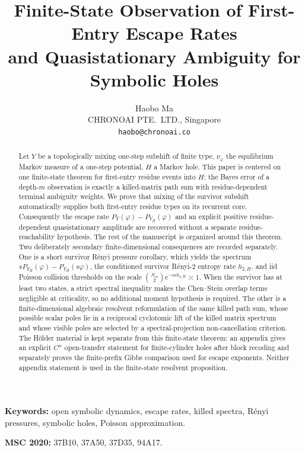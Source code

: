 \documentclass[10pt,a4paper]{article}
\title{Finite-State Observation of First-Entry Escape Rates\\
and Quasistationary Ambiguity for Symbolic Holes}
\author{Haobo Ma\\
\small CHRONOAI PTE.\ LTD., Singapore\\
\small\texttt{haobo@chronoai.co}}
\date{}
\theoremstyle{plain}
\theoremstyle{definition}
\theoremstyle{remark}
\begin{document}
\maketitle

\begin{abstract}
Let \(Y\) be a topologically mixing one-step subshift of finite type,
\(\nu_\varphi\) the equilibrium Markov measure of a one-step potential,
\(H\) a Markov hole.  This paper is centered on one finite-state
theorem for first-entry residue events into \(H\): the Bayes error of a
depth-\(m\) observation is exactly a killed-matrix path sum with
residue-dependent terminal ambiguity weights.  We prove that mixing of
the survivor subshift automatically supplies both first-entry residue
types on its recurrent core.  Consequently the escape rate
\(P_Y(\varphi)-P_{Y_H}(\varphi)\) and an explicit positive
residue-dependent quasistationary amplitude are recovered without a
separate residue-reachability hypothesis.  The rest of the manuscript
is organized around this theorem.  Two deliberately secondary
finite-dimensional consequences are recorded separately.  One is a
short survivor R\'enyi pressure corollary, which yields the spectrum
\(sP_{Y_H}(\varphi)-P_{Y_H}(s\varphi)\), the conditioned survivor
R\'enyi-\(2\) entropy rate \(h_{2,H}\), and iid Poisson collision
thresholds on the scale
\(\binom{N_m}{2}e^{-mh_{2,H}}\asymp 1\).  When the survivor has at
least two states, a strict spectral inequality makes the Chen--Stein
overlap terms negligible at criticality, so no additional moment
hypothesis is required.  The other is a finite-dimensional
algebraic resolvent reformulation of the same killed path sum, whose possible
scalar poles lie in a reciprocal cyclotomic lift of the killed matrix
spectrum and whose visible poles are selected by a spectral-projection
non-cancellation criterion.  The H\"older material is kept separate from
this finite-state theorem: an appendix gives an explicit \(C^\alpha\)
open-transfer statement for finite-cylinder holes after block recoding
and separately proves the finite-prefix Gibbs comparison used for escape
exponents.  Neither appendix statement is used in the finite-state
resolvent proposition.
\end{abstract}

{\small
\noindent\textbf{Keywords:}
open symbolic dynamics, escape rates, killed spectra, R\'enyi
pressures, symbolic holes, Poisson approximation.

\medskip
\noindent\textbf{MSC 2020:}
37B10, 37A50, 37D35, 94A17.
}

\bigskip










\appendix






\end{document}
